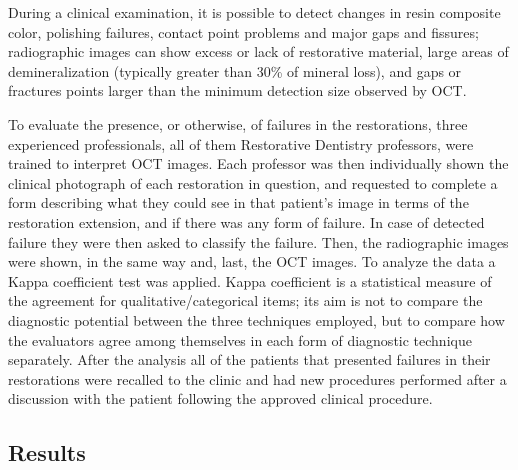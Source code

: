 \documentclass[12pt,twoside,english]{book}
\renewcommand{\~}{\perispomeni}%
\numberwithin{equation}{section}
\numberwithin{figure}{section}
\begin{document}
During a clinical examination, it is possible to detect changes in resin composite color, polishing failures, contact point problems and major gaps and fissures; radiographic images can show excess or lack of restorative material, large areas of demineralization (typically greater than 30\% of mineral loss), and gaps or fractures points larger than the minimum detection size observed by OCT.

To evaluate the presence, or otherwise, of failures in the restorations, three experienced professionals, all of them Restorative Dentistry professors, were trained to interpret OCT images. Each professor was then individually shown the clinical photograph of each restoration in question, and requested to complete a form describing what they could see in that patient's image in terms of the restoration extension, and if there was any form of failure. In case of detected failure they were then asked to classify the failure. Then, the radiographic images were shown, in the same way and, last, the OCT images. To analyze the data a Kappa coefficient test was applied. Kappa coefficient is a statistical measure of the agreement for qualitative/categorical items; its aim is not to compare the diagnostic potential between the three techniques employed, but to compare how the evaluators agree among themselves in each form of diagnostic technique separately. After the analysis all of the patients that presented failures in their restorations were recalled to the clinic and had new procedures performed after a discussion with the patient following the approved clinical procedure.

\subsection{Results}
\end{document}
